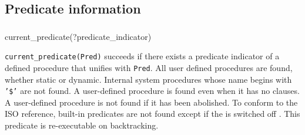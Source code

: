 \subsection{Predicate information}

\subsubsection{\label{current-predicate/1}}

\begin{TemplatesOneCol}
current\_predicate(?predicate\_indicator)

\end{TemplatesOneCol}

\Description

\texttt{current\_predicate(Pred)} succeeds if there
exists a predicate indicator of a defined procedure that unifies with
\texttt{Pred}. All user defined procedures are found, whether static or
dynamic. Internal system procedures whose name begins
with \texttt{'\$'} are not found. A user-defined procedure is found
even when it has no clauses. A user-defined procedure is not found if
it has been abolished. To conform to the ISO reference, built-in predicates
are not found except if the   is switched
off . This predicate is re-executable on
backtracking.

\begin{PlErrors}






\end{PlErrors}

